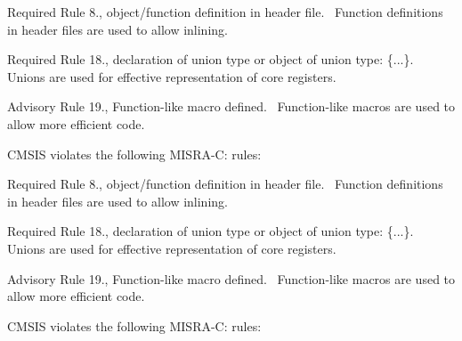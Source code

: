 \begin{DoxyItemize}
\item Required Rule 8., object/\+function definition in header file.~\newline
 Function definitions in header files are used to allow \textquotesingle{}inlining\textquotesingle{}.\end{DoxyItemize}
\begin{DoxyItemize}
\item Required Rule 18., declaration of union type or object of union type:\+ \textquotesingle{}\{...\}\textquotesingle{}.~\newline
 Unions are used for effective representation of core registers.\end{DoxyItemize}
\begin{DoxyItemize}
\item Advisory Rule 19., Function-\/like macro defined.~\newline
 Function-\/like macros are used to allow more efficient code.\end{DoxyItemize}


CMSIS violates the following MISRA-\/C: rules:\+

\begin{DoxyItemize}
\item Required Rule 8., object/\+function definition in header file.~\newline
 Function definitions in header files are used to allow \textquotesingle{}inlining\textquotesingle{}.\end{DoxyItemize}
\begin{DoxyItemize}
\item Required Rule 18., declaration of union type or object of union type:\+ \textquotesingle{}\{...\}\textquotesingle{}.~\newline
 Unions are used for effective representation of core registers.\end{DoxyItemize}
\begin{DoxyItemize}
\item Advisory Rule 19., Function-\/like macro defined.~\newline
 Function-\/like macros are used to allow more efficient code.\end{DoxyItemize}


CMSIS violates the following MISRA-\/C: rules:\+

